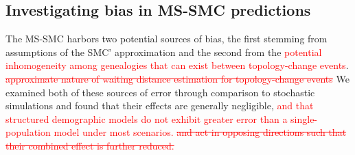 \documentclass[11pt]{article}
\begin{document}
\subsection{Investigating bias in MS-SMC predictions}
The MS-SMC harbors two potential sources of bias, the first stemming from 
assumptions of the SMC' approximation and the second from the 
\textcolor{red}{potential inhomogeneity among genealogies that can exist 
between topology-change events}.
\textcolor{red}{\sout{approximate 
nature of waiting distance estimation for topology-change events}}
% 
We examined both of these sources of error through comparison to stochastic
simulations and found that their effects are generally negligible,
\textcolor{red}{and that structured demographic models do not exhibit 
greater error than a single-population model under most scenarios.}
\textcolor{red}{\sout{and act in opposing 
directions such that their combined effect is further reduced.}}
\end{document}
